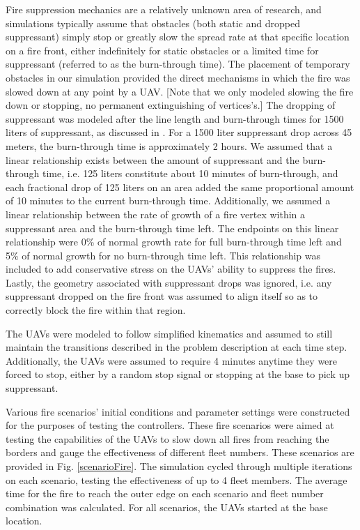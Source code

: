 \documentclass{ieeeaccess}
\begin{document}
Fire suppression mechanics are a relatively unknown area of research, and simulations typically assume that obstacles (both static and dropped suppressant) simply stop or greatly slow the spread rate at that specific location on a fire front, either indefinitely for static obstacles or a limited time for suppressant (referred to as the burn-through time). The placement of temporary obstacles in our simulation provided the direct mechanisms in which the fire was slowed down at any point by a UAV. [Note that we only modeled slowing the fire down or stopping, no permanent extinguishing of vertices's.] The dropping of suppressant was modeled after the line length and burn-through times for 1500 liters of suppressant, as discussed in \cite{australiafirereport}. For a 1500 liter suppressant drop across 45 meters, the burn-through time is approximately 2 hours. We assumed that a linear relationship exists between the amount of suppressant and the burn-through time, i.e. 125 liters constitute about 10 minutes of burn-through, and each fractional drop of 125 liters on an area added the same proportional amount of 10 minutes to the current burn-through time. Additionally, we assumed a linear relationship between the rate of growth of a fire vertex within a suppressant area and the burn-through time left. The endpoints on this linear relationship were 0\% of normal growth rate for full burn-through time left and 5\% of normal growth for no burn-through time left. This relationship was included to add conservative stress on the UAVs' ability to suppress the fires. Lastly, the geometry associated with suppressant drops was ignored, i.e. any suppressant dropped on the fire front was assumed to align itself so as to correctly block the fire within that region. 

The UAVs were modeled to follow simplified kinematics and assumed to still maintain the transitions described in the problem description at each time step. Additionally, the UAVs were assumed to require 4 minutes anytime they were forced to stop, either by a random stop signal or stopping at the base to pick up suppressant.



Various fire scenarios' initial conditions and parameter settings were constructed for the purposes of testing the controllers. These fire scenarios were aimed at testing the capabilities of the UAVs to slow down all fires from reaching the borders and gauge the effectiveness of different fleet numbers. These scenarios are provided in Fig. \ref{scenarioFire}. The simulation cycled through multiple iterations on each scenario, testing the effectiveness of up to 4 fleet members. The average time for the fire to reach the outer edge on each scenario and fleet number combination was calculated. For all scenarios, the UAVs started at the base location.
\end{document}
